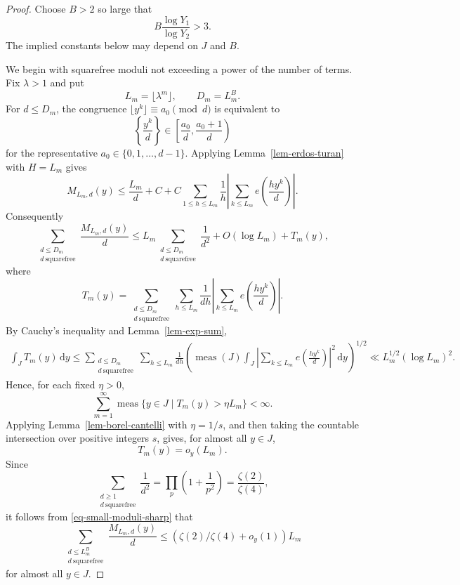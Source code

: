 \documentclass[11pt,reqno]{amsart}
\numberwithin{equation}{section}
\begin{document}
    \begin{proof}
        Choose $B>2$ so large that
        \begin{equation}\label{eq-B-choice}
            B\frac{\log Y_1}{\log Y_2}>3.
        \end{equation}
        The implied constants below may depend on $J$ and $B$.

        We begin with squarefree moduli not exceeding a power of the number of terms. Fix $\lambda>1$ and put
        $$
        L_m=\lfloor \lambda^m\rfloor,\qquad D_m=L_m^B.
        $$
        For $d\le D_m$, the congruence $\lfloor y^k\rfloor\equiv a_0\pmod d$ is equivalent to
        $$
        \left\{\frac{y^k}{d}\right\}\in
        \left[\frac{a_0}{d},\frac{a_0+1}{d}\right)
        $$
        for the representative $a_0\in\{0,1,\ldots,d-1\}$. Applying Lemma~\ref{lem-erdos-turan} with $H=L_m$ gives
        $$
        M_{L_m,d}(y)
        \le \frac{L_m}{d}
        +C
        +C\sum_{1\le h\le L_m}\frac1h
        \left|\sum_{k\le L_m}e\left(\frac{h y^k}{d}\right)\right|.
        $$
        Consequently
        \begin{equation}\label{eq-small-moduli-sharp}
            \sum_{\substack{d\le D_m\\ d\ \mathrm{squarefree}}}\frac{M_{L_m,d}(y)}d
            \le L_m\sum_{\substack{d\le D_m\\ d\ \mathrm{squarefree}}}\frac1{d^2}+O(\log L_m)+T_m(y),
        \end{equation}
        where
        $$
        T_m(y)=\sum_{\substack{d\le D_m\\ d\ \mathrm{squarefree}}}\sum_{h\le L_m}\frac1{dh}
        \left|\sum_{k\le L_m}e\left(\frac{h y^k}{d}\right)\right|.
        $$
        By Cauchy's inequality and Lemma~\ref{lem-exp-sum},
        \begin{align*}
            \int_J T_m(y)\,\mathrm{d}y\!
            \le
            \sum_{\substack{d\le D_m\\ d\ \mathrm{squarefree}}}\sum_{h\le L_m}\frac{1}{dh}
            \left(\operatorname{meas}(J)\int_J\left|\sum_{k\le L_m}e\left(\frac{h y^k}{d}\right)\right|^2\,\mathrm{d}y\right)^{1/2} 
            \!\ll L_m^{1/2}(\log L_m)^2.
        \end{align*}
        Hence, for each fixed $\eta>0$,
        $$
        \sum_{m=1}^{\infty}
        \operatorname{meas}\{y\in J\mid T_m(y)>\eta L_m\}<\infty.
        $$
        Applying Lemma~\ref{lem-borel-cantelli} with $\eta=1/s$, and then taking the countable intersection over positive integers $s$, gives, for almost all $y\in J$,
        $$
        T_m(y)=o_y(L_m).
        $$
        Since
        $$
        \sum_{\substack{d\ge1\\ d\ \mathrm{squarefree}}}\frac1{d^2}
        =\prod_p\left(1+\frac1{p^2}\right)
        =\frac{\zeta(2)}{\zeta(4)},
        $$
        it follows from \eqref{eq-small-moduli-sharp} that
        $$
        \sum_{\substack{d\le L_m^B\\ d\ \mathrm{squarefree}}}\frac{M_{L_m,d}(y)}d
        \le (\zeta(2)/\zeta(4)+o_y(1))L_m
        $$
        for almost all $y\in J$.


\end{proof}
\end{document}
